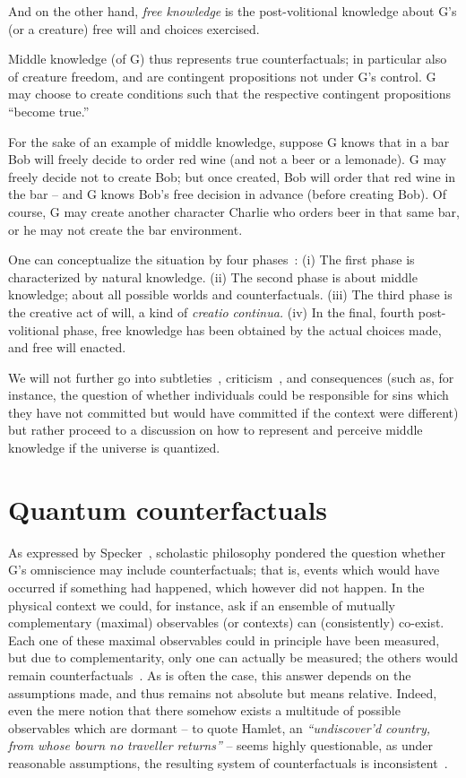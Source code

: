 \documentclass[%
  twocolumn,
 showpacs,
 showkeys,
 preprintnumbers,
 amsmath,amssymb,
 aps,
  pra,
  longbibliography,
 ]{revtex4-1}
\begin{document}
And on the other hand,  {\em free knowledge} is the post-volitional knowledge about G's (or a creature) free will and choices exercised.

Middle knowledge (of G) thus represents true counterfactuals; in particular also  of  creature  freedom, and are contingent propositions not under G's control.
G may choose to create conditions such that the respective contingent propositions ``become true.''

For the sake of an example of middle knowledge, suppose G knows that in a bar Bob will freely decide to order red wine (and not a beer or a lemonade).
G may freely decide not to create Bob; but once created, Bob will order that red wine in the bar -- and G knows Bob's free decision in advance (before creating Bob).
Of course, G may create another character Charlie who orders beer in that same bar, or he may not create the bar environment.

One can conceptualize the situation by four phases~\cite[p.~43]{book:502563}:
(i) The first phase is characterized by
natural knowledge.
(ii) The second phase is about middle knowledge; about all possible worlds and counterfactuals.
(iii) The third phase is the creative act of will, a kind of {\it creatio continua.}
(iv) In the final, fourth post-volitional phase, free knowledge has been obtained by the actual choices made, and free will enacted.

We will not further go into subtleties~\cite{book:502563,book:1310279,book:421072}, criticism~\cite{10.2307/20009657,hasker-12},
and consequences (such as, for instance, the question of whether individuals could be responsible for sins which they have not committed but would have committed
if the context were different)
but rather proceed to a discussion on how to represent and perceive middle knowledge if the universe is   quantized.



\section{Quantum counterfactuals}

As expressed by Specker~\cite{kochen1}, scholastic philosophy pondered the question whether G's omniscience may include counterfactuals; that is,
events which would have occurred if something had happened, which however did not happen.
In the physical context we could, for instance,
ask if an ensemble of mutually complementary (maximal) observables (or contexts) can (consistently) co-exist. Each one of these maximal observables could in principle have been measured,
but due to complementarity, only one can actually be measured; the others would remain counterfactuals~\cite{vaidman:2009}.
As is often the case, this answer depends on the  assumptions made, and thus remains not absolute but means relative.
Indeed, even the mere notion that there somehow exists a multitude of possible observables which are dormant -- to quote Hamlet, an {\it ``undiscover'd country, from whose bourn no traveller returns''} --
seems highly questionable, as under reasonable %
assumptions, the resulting system of counterfactuals is inconsistent~\cite{kochen1,peres222,pitowsky:218,2015-AnalyticKS}.
\end{document}
